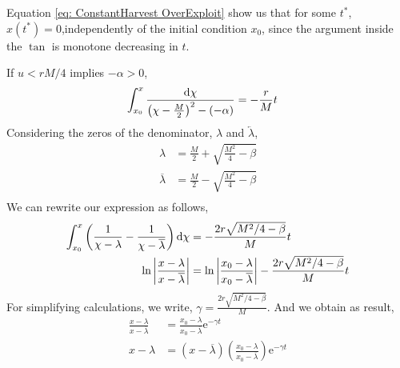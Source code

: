 Equation \ref{eq: ConstantHarvest OverExploit} show us that for some $t^*$, $x(t^*)=0$,independently of the initial condition $x_0$, since the argument inside the $\tan$ is monotone decreasing in $t$. 

If $u<rM/4$ implies $-\alpha>0$,
\begin{align*}
	\int_{x_0}^{x}\frac{\mathrm{d} \chi}{\left(\chi-\frac{M}{2}\right)^2-(-\alpha)} &=-\frac{r}{M}t
\end{align*}
Considering the zeros of the denominator, $\lambda$ and $\overleftarrow{\lambda}$, 
\begin{equation}
	\begin{array}{cc}
	\lambda&=\frac{M}{2}+\sqrt{\frac{M^2}{4}-\beta} \\
	\overline{\lambda}&=\frac{M}{2}-\sqrt{\frac{M^2}{4}-\beta} \\
	\end{array}
\end{equation}
We can rewrite our expression as follows, 
\begin{align*}
\int_{x_0}^{x} \left(\frac{1}{\chi - \lambda}-\frac{1}{\chi - \overline{\lambda}}\right)\mathrm{d} \chi &=-\frac{2r\sqrt{M^2/4-\beta}}{M}t \\
	\ln\left|\frac{x - \lambda}{x - \overline{\lambda}}\right|&=\ln\left|\frac{x_0- \lambda}{x_0 - \overline{\lambda}}\right|-\frac{2r\sqrt{M^2/4-\beta}}{M}t
\end{align*}
For simplifying calculations, we write, $\gamma=\frac{2r\sqrt{M^2/4-\beta}}{M}$. And we obtain as result,
\begin{align}
\frac{x - \lambda}{x - \overline{\lambda}} &=\frac{x_0- \lambda}{x_0- \overline{\lambda}}\mathrm e^{-\gamma t} \\
x-\lambda &=\left(x-\overline{\lambda}\right)\left(\frac{x_0- \lambda}{x_0- \overline{\lambda}}\right)\mathrm e^{-\gamma t}
\end{align}

